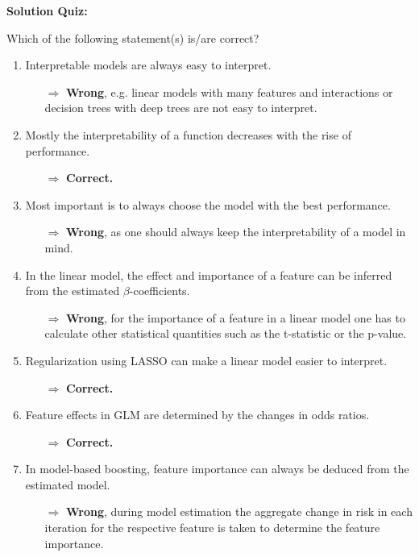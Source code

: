\textbf{Solution Quiz:}\\\noindent
\medskip

Which of the following statement(s) is/are correct?  
	\begin{enumerate}
        \item Interpretable models are always easy to interpret.
        \begin{itemize}
        	\item[$\Rightarrow$] \textbf{Wrong}, e.g. linear models with many features and interactions or decision trees with deep trees are not easy to interpret.
        \end{itemize}
    	\item Mostly the interpretability of a function decreases with the rise of performance.
    	\begin{itemize}
    		\item[$\Rightarrow$] \textbf{Correct.}
    	\end{itemize}
    	\item Most important is to always choose the model with the best performance.
    	\begin{itemize}
    		\item[$\Rightarrow$] \textbf{Wrong}, as one should always keep the interpretability of a model in mind.
    	\end{itemize}
    	\item In the linear model, the effect and importance of a feature can be inferred from the estimated $\beta$-coefficients.
    	\begin{itemize}
    		\item[$\Rightarrow$] \textbf{Wrong}, for the importance of a feature in a linear model one has to calculate other statistical quantities such as the t-statistic or the p-value.
    	\end{itemize}
    	\item Regularization using LASSO can make a linear model easier to interpret.
    	\begin{itemize}
    		\item[$\Rightarrow$] \textbf{Correct.}
    	\end{itemize}
    	\item Feature effects in GLM are determined by the changes in odds ratios.
    	\begin{itemize}
    		\item[$\Rightarrow$] \textbf{Correct.}
    	\end{itemize}
    	\item In model-based boosting, feature importance can always be deduced from the estimated model.
    	\begin{itemize}
    		\item[$\Rightarrow$] \textbf{Wrong}, during model estimation the aggregate change in risk in each iteration for the respective feature is taken to determine the feature importance.
    	\end{itemize}
	\end{enumerate}